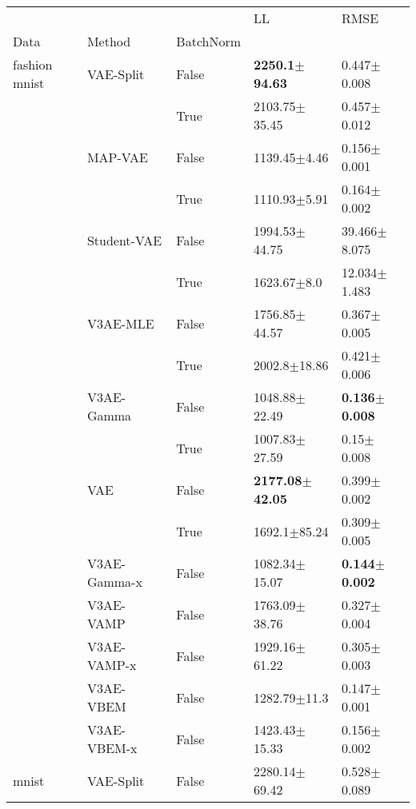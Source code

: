 \begin{tabular}{lllll}
\toprule
             &     &       &                          LL &                      RMSE \\
Data & Method & BatchNorm &                             &                           \\
\midrule
fashion mnist & VAE-Split & False &   \textbf{2250.1$\pm$94.63} &           0.447$\pm$0.008 \\
             &     & True  &           2103.75$\pm$35.45 &           0.457$\pm$0.012 \\
             & MAP-VAE & False &            1139.45$\pm$4.46 &           0.156$\pm$0.001 \\
             &     & True  &            1110.93$\pm$5.91 &           0.164$\pm$0.002 \\
             & Student-VAE & False &           1994.53$\pm$44.75 &          39.466$\pm$8.075 \\
             &     & True  &             1623.67$\pm$8.0 &          12.034$\pm$1.483 \\
             & V3AE-MLE & False &           1756.85$\pm$44.57 &           0.367$\pm$0.005 \\
             &     & True  &            2002.8$\pm$18.86 &           0.421$\pm$0.006 \\
             & V3AE-Gamma & False &           1048.88$\pm$22.49 &  \textbf{0.136$\pm$0.008} \\
             &     & True  &           1007.83$\pm$27.59 &            0.15$\pm$0.008 \\
             & VAE & False &  \textbf{2177.08$\pm$42.05} &           0.399$\pm$0.002 \\
             &     & True  &            1692.1$\pm$85.24 &           0.309$\pm$0.005 \\
             & V3AE-Gamma-x & False &           1082.34$\pm$15.07 &  \textbf{0.144$\pm$0.002} \\
             & V3AE-VAMP & False &           1763.09$\pm$38.76 &           0.327$\pm$0.004 \\
             & V3AE-VAMP-x & False &           1929.16$\pm$61.22 &           0.305$\pm$0.003 \\
             & V3AE-VBEM & False &            1282.79$\pm$11.3 &           0.147$\pm$0.001 \\
             & V3AE-VBEM-x & False &           1423.43$\pm$15.33 &           0.156$\pm$0.002 \\
mnist & VAE-Split & False &           2280.14$\pm$69.42 &           0.528$\pm$0.089 \\

\end{tabular}
